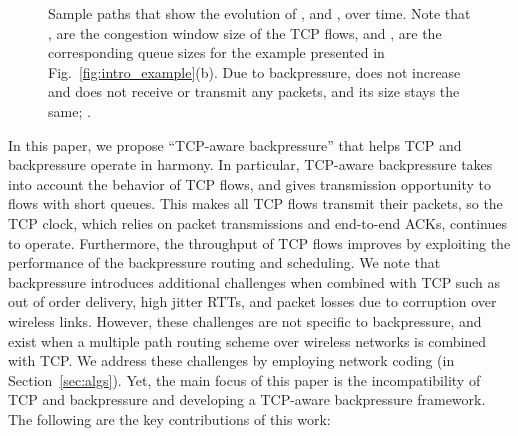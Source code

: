 \documentclass[conference]{IEEEtran}
\begin{document}
\begin{figure}
\vspace{-10pt}
\centering
{}
\vspace{-5pt}
\caption{\scriptsize Sample paths that show the evolution of , and ,  over time. Note that , are the congestion window size of the TCP flows, and  ,  are the corresponding queue sizes for the example presented in Fig.~\ref{fig:intro_example}(b). Due to backpressure,  does not increase and  does not receive or transmit any packets, and its size stays the same; .}
\label{fig:window_queue_evolution}
\vspace{-20pt}
\end{figure}


In this paper, we propose ``TCP-aware backpressure'' that helps TCP and backpressure operate in harmony. In particular, TCP-aware backpressure takes into account the behavior of TCP flows, and gives transmission opportunity to flows with short queues. This makes all TCP flows transmit their packets, so the TCP clock, which relies on packet transmissions and end-to-end ACKs, continues to operate. Furthermore, the throughput of TCP flows improves by exploiting the performance of the backpressure routing and scheduling. We note that backpressure introduces additional challenges when combined with TCP such as out of order delivery, high jitter RTTs, and packet losses due to corruption over wireless links. However, these challenges are not specific to backpressure, and exist when a multiple path routing scheme over wireless networks is combined with TCP. We address these challenges by employing network coding (in Section~\ref{sec:algs}). Yet, the main focus of this paper is the incompatibility of TCP and backpressure and developing a TCP-aware backpressure framework. The following are the key contributions of this work:
\end{document}
